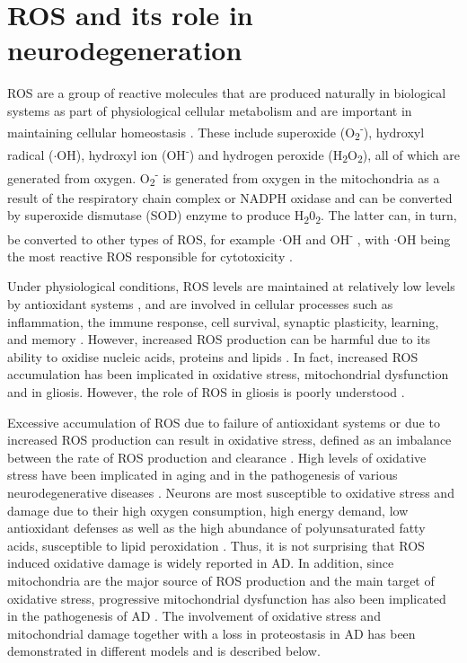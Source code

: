 \section{ROS and its role in neurodegeneration}
ROS are a group of reactive molecules that are produced naturally in biological systems as part of physiological cellular metabolism and are important in maintaining cellular homeostasis \citep{Cenini2019}. These include superoxide (O\textsubscript{2}\textsuperscript{-}), hydroxyl radical ($\cdot$OH), hydroxyl ion (OH\textsuperscript{-}) and hydrogen peroxide (H\textsubscript{2}O\textsubscript{2}), all of which are generated from oxygen. O\textsubscript{2}\textsuperscript{-} is generated from oxygen in the mitochondria as a result of the respiratory chain complex or NADPH oxidase and can be converted by superoxide dismutase (SOD) enzyme to produce H\textsubscript{2}0\textsubscript{2}. The latter can, in turn, be converted to other types of ROS, for example $\cdot$OH and OH\textsuperscript{-} \citep{Kim2015a}, with $\cdot$OH being the most reactive ROS responsible for cytotoxicity \citep{Bolisetty2013}.

Under physiological conditions, ROS levels are maintained at relatively low levels by antioxidant systems \citep{Dasuri2013,Gandhi2012}, and are involved in cellular processes such as inflammation, the immune response, cell survival, synaptic plasticity, learning, and memory \citep{Cenini2019,Kishida2007,Liu2017}. However, increased ROS production can be harmful due to its ability to oxidise nucleic acids, proteins and lipids \citep{Wang2014}. In fact, increased ROS accumulation has been implicated in oxidative stress, mitochondrial dysfunction and in gliosis. However, the role of ROS in gliosis is poorly understood \citep{Kishida2007}.

Excessive accumulation of ROS due to failure of antioxidant systems or due to increased ROS production can result in oxidative stress, defined as an imbalance between the rate of ROS production and clearance \citep{Wang2014}. High levels of oxidative stress have been implicated in aging and in the pathogenesis of various neurodegenerative diseases \citep{Bonda2010,Cenini2019,Liu2017,Shibata2008}. Neurons are most susceptible to oxidative stress and damage due to their high oxygen consumption, high energy demand, low antioxidant defenses as well as the high abundance of polyunsaturated fatty acids, susceptible to lipid peroxidation \citep{Cobley2018}. Thus, it is not surprising that ROS induced oxidative damage is widely reported in AD. In addition, since mitochondria are the major source of ROS production and the main target of oxidative stress, progressive mitochondrial dysfunction has also been implicated in the pathogenesis of AD \citep{Swerdlow2007}. The involvement of oxidative stress and mitochondrial damage together with a loss in proteostasis in AD has been demonstrated in different models and is described below. 


